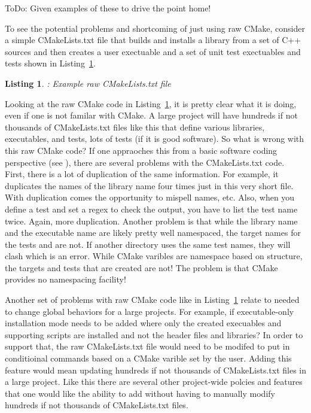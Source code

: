 \documentclass[10pt]{article}
\newtheorem{listing}{Listing}
\begin{document}
ToDo: Given examples of these to drive the point home!

To see the potential problems and shortcoming of just using raw CMake, consider a simple CMakeLists.txt file that builds and installs a library from a set of C++ sources and then creates a user exectuable and a set of unit test exectuables and tests shown in Listing~\ref{listing:RawHelloWorld}.

\begin{listing}: Example raw CMakeLists.txt file
\label{listing:RawHelloWorld}
{\small

}
\end{listing}

Looking at the raw CMake code in Listing~\ref{listing:RawHelloWorld}, it is pretty clear what it is doing, even if one is not familar with CMake.  A large project will have hundreds if not thousands of CMakeLists.txt files like this that define various libraries, executables, and tests, lots of tests (if it is good software).  So what is wrong with this raw CMake code?  If one appraoches this from a basic software coding perspective (see \cite{CodeComplete2nd04}), there are several problems with the CMakeLists.txt code.  First, there is a lot of duplication of the same information.  For example, it duplicates the names of the library name  four times just in this very short file.  With duplication comes the opportunity to mispell names, etc.  Also, when you define a test and set a regex to check the output, you have to list the test name twice.  Again, more duplication.  Another problem is that while the library name  and the executable name  are likely pretty well namespaced, the target names for the tests  and  are not.  If another directory uses the same test names, they will clash which is an error.  While CMake varibles are namespace based on  structure, the targets and tests that are created are not!  The problem is that CMake provides no namespacing facility!

Another set of problems with raw CMake code like in Listing~\ref{listing:RawHelloWorld} relate to needed to change global behaviors for a large projects.  For example, if executable-only installation mode needs to be added where only the created execuables and supporting scripts are installed and not the header files and libraries?  In order to support that, the raw CMakeLists.txt file would need to be modifed to put in conditioinal  commands based on a CMake varible set by the user.  Adding this feature would mean updating hundreds if not thousands of CMakeLists.txt files in a large project.  Like this there are several other project-wide polcies and features that one would like the ability to add without having to manually modify hundreds if not thousands of CMakeLists.txt files.
\end{document}
